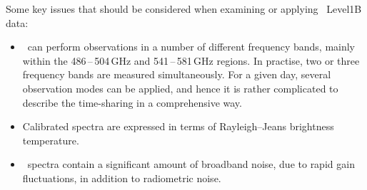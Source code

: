 Some key issues that should be considered when examining or applying \smr\
Level1B data:
\begin{itemize}

\item \smr\ can perform observations in a number of different frequency
bands, mainly within the 486\,--\,504\,GHz and 541\,--\,581\,GHz regions.
In practise, two or three frequency bands are measured simultaneously.
For a given day, several observation modes can be applied, and hence
it is rather complicated to describe the time-sharing in a 
comprehensive way.
 

\item Calibrated spectra are expressed in terms of Rayleigh--Jeans brightness temperature.

\item \smr\ spectra contain a significant amount of broadband noise, 
due to rapid gain fluctuations, in addition to radiometric noise.


\end{itemize}

